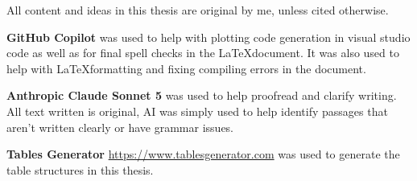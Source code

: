 \begin{appendices}
All content and ideas in this thesis are original by me, unless cited otherwise. \par 

\textbf{GitHub Copilot} was used to help with plotting code generation in visual studio code as well as for final spell checks in the \LaTeX document. It was also used to help with \LaTeX formatting and fixing compiling errors in the document. \par

\textbf{Anthropic Claude Sonnet 5} was used to help proofread and clarify writing. All text written is original, AI was simply used to help identify passages that aren't written clearly or have grammar issues.\par 

\textbf{Tables Generator} \url{https://www.tablesgenerator.com} was used to generate the table structures in this thesis. \par


\end{appendices}

